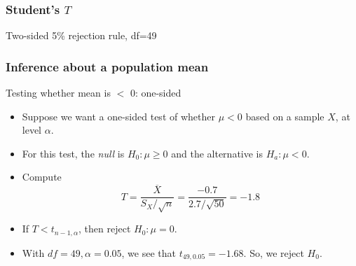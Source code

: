 \documentclass[handout]{beamer}
\begin{document}
   \begin{frame}
   \frametitle{Student's $T$}
   \begin{center}
   \end{center}
   Two-sided {\color{blue} 5\% rejection rule}, df=49
   \end{frame}


   \begin{frame} \frametitle{Inference about a population mean}

   \begin{block}
   {Testing whether mean is $<$ 0: one-sided}
   \begin{itemize}
   \item  Suppose we want a one-sided test of whether $\mu < 0$ based
   on a sample $X$, at level $\alpha$.
   \item For this test, the {\em null} is $H_0:\mu \geq 0$ and
   the alternative is $H_a: \mu < 0$.
   \item Compute
   $$
   T = \frac{\overline{X}}{S_X/\sqrt{n}} = \frac{-0.7}{2.7/\sqrt{50}}=-1.8$$
   \item If $T < t_{n-1, \alpha}$, then reject $H_0:\mu=0$.
   \item With $df=49, \alpha=0.05$, we see that $t_{49,0.05}=-1.68$. So,
   we reject $H_0$.
   \end{itemize}
   \end{block}
   \end{frame}

\end{document}
